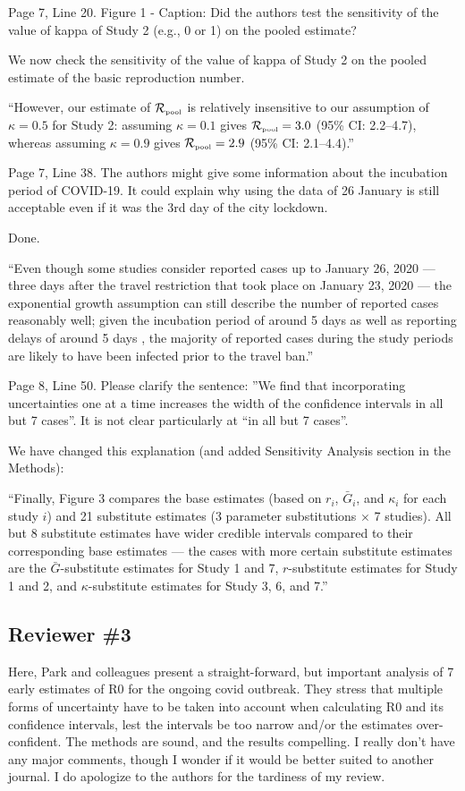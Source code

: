 \documentclass[12pt]{article}
\newcommand{\Rpool}{\ensuremath{{\mathcal R}_{\textrm{\tiny{pool}}}}\xspace}
\newcommand{\rev}{\subsection*}
\newcommand{\revtext}{\textsf}
\begin{document}
\revtext{Page 7, Line 20. Figure 1 - Caption: Did the authors test the sensitivity of the value of kappa of
Study 2 (e.g., 0 or 1) on the pooled estimate?}

We now check the sensitivity of the value of kappa of Study 2 on the pooled estimate of the basic reproduction number.

``However, our estimate of \Rpool is relatively insensitive to our assumption of $\kappa=0.5$ for Study 2: assuming $\kappa=0.1$ gives $\Rpool = 3.0$ (95\% CI: 2.2--4.7), whereas assuming $\kappa=0.9$ gives $\Rpool = 2.9$ (95\% CI: 2.1--4.4).''

\revtext{Page 7, Line 38. The authors might give some information about the incubation period of
COVID-19. It could explain why using the data of 26 January is still acceptable even if it was the
3rd day of the city lockdown.}

Done.

``Even though some studies consider reported cases up to January 26, 2020 --- three days after the travel restriction that took place on January 23, 2020 \citep{Tianeabb6105} --- the exponential growth assumption can still describe the number of reported cases reasonably well;
given the incubation period of around 5 days \citep{lauer2020incubation} as well as reporting delays of around 5 days \citep{sun2020early}, the majority of reported cases during the study periods are likely to have been infected prior to the travel ban.''

\revtext{Page 8, Line 50. Please clarify the sentence: ”We find that incorporating uncertainties one at a
time increases the width of the confidence intervals in all but 7 cases”. It is not clear particularly
at “in all but 7 cases”.}

We have changed this explanation (and added Sensitivity Analysis section in the Methods): 

``Finally, Figure 3 compares the base estimates (based on $r_i$, $\bar G_i$, and $\kappa_i$ for each study $i$) and 21 substitute estimates (3 parameter substitutions $\times$ 7 studies).
All but 8 substitute estimates have wider credible intervals compared to their corresponding base estimates --- the cases with more certain substitute estimates are the $\bar G$-substitute estimates for Study 1 and 7, $r$-substitute estimates for Study 1 and 2, and  $\kappa$-substitute estimates for Study 3, 6, and 7.''

\rev{Reviewer \#3}

\revtext{
Here, Park and colleagues present a straight-forward, but important analysis of 7 early estimates of R0 for the ongoing covid outbreak. They stress that multiple forms of uncertainty have to be taken into account when calculating R0 and its confidence intervals, lest the intervals be too narrow and/or the estimates over-confident. The methods are sound, and the results compelling. I really don’t have any major comments, though I wonder if it would be better suited to another journal. I do apologize to the authors for the tardiness of my review.}
\end{document}
